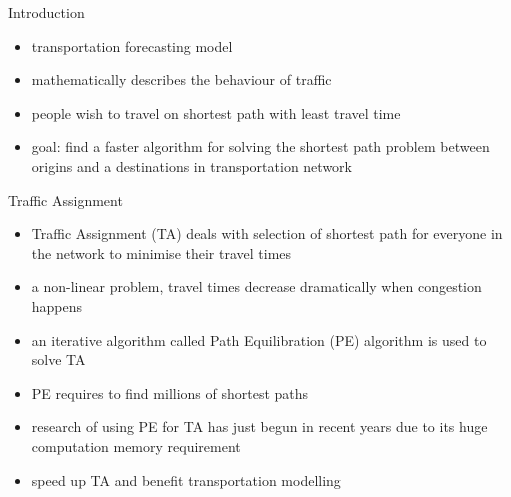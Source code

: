 \documentclass[final]{beamer}
\begin{document}
\begin{frame}{ }
    \begin{columns}[t]
        \begin{column}{.28\linewidth}

            \begin{block}{Introduction}
                \begin{itemize}
                    \item transportation forecasting model
                    \item mathematically describes the behaviour of traffic
                    \item people wish to travel on shortest path with least travel time
                    \item \alert{goal}: find a \alert{faster} algorithm for solving the \alert{shortest path} problem between origins and a destinations in transportation network
                \end{itemize}
            \end{block}

            \begin{block}{Traffic Assignment}
                \begin{itemize}
                    \item \alert{Traffic Assignment (TA)} deals with selection of \alert{shortest path} for everyone in the network to \alert{minimise} their \alert{travel times}
                    \item a \alert{non-linear} problem, travel times decrease dramatically when \alert{congestion} happens
                    \item an \alert{iterative algorithm} called \alert{Path Equilibration (PE)} algorithm is used to solve TA
                    \item \alert{PE} requires to find \alert{millions} of \alert{shortest paths}
                    \item research of using PE for TA has just begun in recent years due to its \alert{huge} computation \alert{memory} requirement
                    \item speed up TA and benefit transportation modelling
                \end{itemize}
            \end{block}


\end{column}
\end{columns}
\end{frame}
\end{document}
